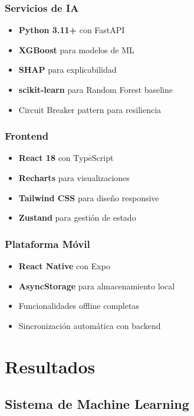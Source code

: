 \documentclass[12pt,a4paper]{article}
\begin{document}
\subsubsection{Servicios de IA}
\begin{itemize}
    \item \textbf{Python 3.11+} con FastAPI
    \item \textbf{XGBoost} para modelos de ML
    \item \textbf{SHAP} para explicabilidad
    \item \textbf{scikit-learn} para Random Forest baseline
    \item Circuit Breaker pattern para resiliencia
\end{itemize}

\subsubsection{Frontend}
\begin{itemize}
    \item \textbf{React 18} con TypeScript
    \item \textbf{Recharts} para visualizaciones
    \item \textbf{Tailwind CSS} para diseño responsive
    \item \textbf{Zustand} para gestión de estado
\end{itemize}

\subsubsection{Plataforma Móvil}
\begin{itemize}
    \item \textbf{React Native} con Expo
    \item \textbf{AsyncStorage} para almacenamiento local
    \item Funcionalidades offline completas
    \item Sincronización automática con backend
\end{itemize}

\section{Resultados}

\subsection{Sistema de Machine Learning}
\end{document}
